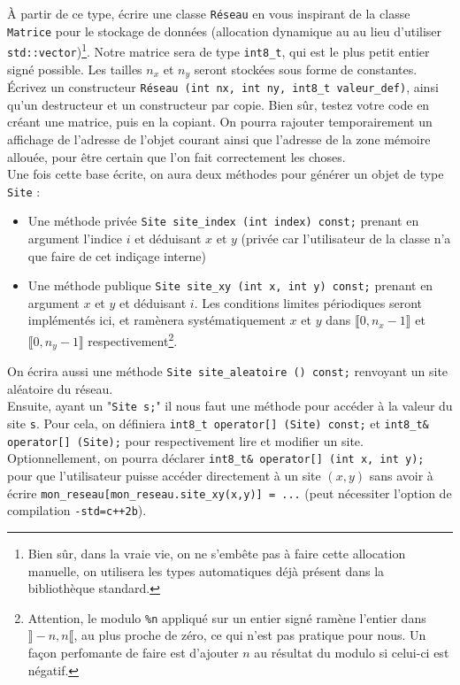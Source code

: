 \documentclass{book}
\newcommand{\inline}[1]{\texttt{#1}}
\begin{document}
À partir de ce type, écrire une classe \inline{Réseau} en vous inspirant de la classe \inline{Matrice} pour le stockage de données (allocation dynamique au au lieu d'utiliser \inline{std::vector})\footnote{Bien sûr, dans la vraie vie, on ne s'embête pas à faire cette allocation manuelle, on utilisera les types automatiques déjà présent dans la bibliothèque standard.}. Notre matrice sera de type \inline{int8_t}, qui est le plus petit entier signé possible. Les tailles $n_x$ et $n_y$ seront stockées sous forme de constantes. Écrivez un constructeur \inline{Réseau (int nx, int ny, int8_t valeur_def)}, ainsi qu'un destructeur et un constructeur par copie. Bien sûr, testez votre code en créant une matrice, puis en la copiant. On pourra rajouter temporairement un affichage de l'adresse de l'objet courant ainsi que l'adresse de la zone mémoire allouée, pour être certain que l'on fait correctement les choses.\\

Une fois cette base écrite, on aura deux méthodes pour générer un objet de type \inline{Site} :
\begin{itemize}
  \item Une méthode privée \inline{Site site_index (int index) const;} prenant en argument l'indice $i$ et déduisant $x$ et $y$ (privée car l'utilisateur de la classe n'a que faire de cet indiçage interne)
  \item Une méthode publique \inline{Site site_xy (int x, int y) const;} prenant en argument $x$ et $y$ et déduisant $i$. Les conditions limites périodiques seront implémentés ici, et ramènera systématiquement $x$ et $y$ dans $\llbracket 0,n_x\!-\!1 \rrbracket$ et $\llbracket 0,n_y\!-\!1\rrbracket$ respectivement\footnote{Attention, le modulo \texttt{\%n} appliqué sur un entier signé ramène l'entier dans $\rrbracket-n,n\llbracket$, au plus proche de zéro, ce qui n'est pas pratique pour nous. Un façon perfomante de faire est d'ajouter $n$ au résultat du modulo si celui-ci est négatif.}.
\end{itemize}
On écrira aussi une méthode \inline{Site site_aleatoire () const;} renvoyant un site aléatoire du réseau.\\

Ensuite, ayant un "\inline{Site s;}" il nous faut une méthode pour accéder à la valeur du site \inline{s}. Pour cela, on définiera \inline{int8_t operator[] (Site) const;} et \inline{int8_t& operator[] (Site);} pour respectivement lire et modifier un site. Optionnellement, on pourra déclarer \inline{int8_t& operator[] (int x, int y);} pour que l'utilisateur puisse accéder directement à un site $(x,y)$ sans avoir à écrire \inline{mon_reseau[mon_reseau.site_xy(x,y)] = ...} (peut nécessiter l'option de compilation \texttt{-std=c++2b}).\\
\end{document}
